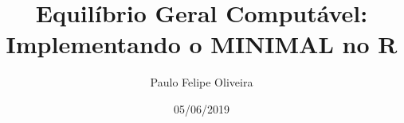 \renewcommand{\baselinestretch}{1.1}

\usepackage[T1]{fontenc}
\usepackage{fbb}

\makeatletter
\def\@maketitle{%
  \newpage
  \thispagestyle{empty}
  \null
  \vskip 1em%
  \begin{center}%
  \let \footnote \thanks
  {\Huge \@title \par}%
    \vskip 1.5em%
    {\large
      \lineskip .2em%
      \@author}%
    \vskip 1em%
  \end{center}%
  \par
  \vskip 1.5em}
\makeatother


\usepackage{fontawesome}

\setlength{\droptitle}{-2em}

  \title{Equilíbrio Geral Computável: Implementando o MINIMAL no R}
    \pretitle{\vspace{\droptitle}\centering\huge}
  \posttitle{\par}
    \author{Paulo Felipe Oliveira}
    \preauthor{\centering\large\emph}
  \postauthor{\par}
      \predate{\centering\large\emph}
  \postdate{\par}
    \date{05/06/2019}


\let\oldShaded\Shaded
\let\endoldShaded\endShaded
\renewenvironment{Shaded}{\footnotesize\oldShaded}{\endoldShaded}

\let\oldverbatim\verbatim
\let\endoldverbatim\endverbatim
\renewenvironment{verbatim}{\footnotesize\oldverbatim}{\endoldverbatim}